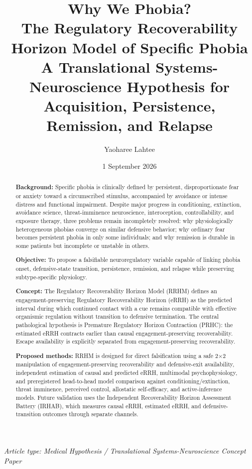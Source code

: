\documentclass[11pt]{article}
\title{\textbf{Why We Phobia?}\\[0.35em]
\large The Regulatory Recoverability Horizon Model of Specific Phobia\\[0.2em]
\normalsize A Translational Systems-Neuroscience Hypothesis for Acquisition, Persistence, Remission, and Relapse}
\author{Yaoharee Lahtee}
\date{1 September 2026}
\begin{document}
\maketitle

\begin{center}
\textit{Article type: Medical Hypothesis / Translational Systems-Neuroscience Concept Paper}
\end{center}

\begin{abstract}
\textbf{Background:} Specific phobia is clinically defined by persistent, disproportionate fear or anxiety toward a circumscribed stimulus, accompanied by avoidance or intense distress and functional impairment. Despite major progress in conditioning, extinction, avoidance science, threat-imminence neuroscience, interoception, controllability, and exposure therapy, three problems remain incompletely resolved: why physiologically heterogeneous phobias converge on similar defensive behavior; why ordinary fear becomes persistent phobia in only some individuals; and why remission is durable in some patients but incomplete or unstable in others.

\textbf{Objective:} To propose a falsifiable neuroregulatory variable capable of linking phobia onset, defensive-state transition, persistence, remission, and relapse while preserving subtype-specific physiology.

\textbf{Concept:} The Regulatory Recoverability Horizon Model (RRHM) defines an engagement-preserving Regulatory Recoverability Horizon (eRRH) as the predicted interval during which continued contact with a cue remains compatible with effective organismic regulation without transition to defensive termination. The central pathological hypothesis is Premature Regulatory Horizon Contraction (PRHC): the estimated eRRH contracts earlier than causal engagement-preserving recoverability. Escape availability is explicitly separated from engagement-preserving recoverability.

\textbf{Proposed methods:} RRHM is designed for direct falsification using a safe 2$\times$2 manipulation of engagement-preserving recoverability and defensive-exit availability, independent estimation of causal and predicted eRRH, multimodal psychophysiology, and preregistered head-to-head model comparison against conditioning/extinction, threat imminence, perceived control, allostatic self-efficacy, and active-inference models. Future validation uses the Independent Recoverability Horizon Assessment Battery (IRHAB), which measures causal eRRH, estimated eRRH, and defensive-transition outcomes through separate channels.


\end{abstract}
\end{document}
